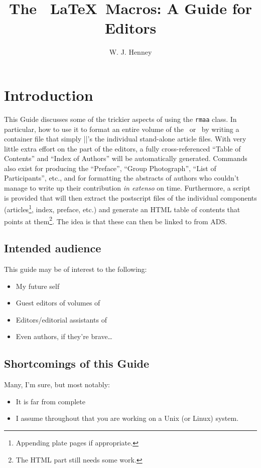 \documentclass[guide]{rmaa}
\title{The \RMAA\ \LaTeX\ Macros: A Guide for Editors\altaffilmark{1}}
\author{W. J. Henney\altaffilmark{2}
  \affil{Instituto de Astronom\'{\i}a, UNAM, Morelia} 
  }
\begin{document}
\maketitle
\tableofcontents 

\section{Introduction}
\label{sec:introduction}

This Guide discusses some of the trickier aspects of using the
\texttt{rmaa} class. In particular, how to use it to format an entire
volume of the \RMAA\ or \RMAASC\ by writing a container file that
simply ||'s the individual stand-alone article files. With very
little extra effort on the part of the editors, a fully
cross-referenced ``Table of Contents'' and ``Index of Authors'' will
be automatically generated. Commands also exist for producing the
``Preface'', ``Group Photograph'', ``List of Participants'', etc., and
for formatting the abstracts of authors who couldn't manage to write
up their contribution \emph{in extenso} on time. Furthermore, a script
is provided that will then extract the postscript files of the
individual components (articles\footnote{Appending plate pages if
  appropriate.}, index, preface, etc.) and generate an HTML table of
contents that points at them\footnote{The HTML part still needs some
  work.}. The idea is that these can then be linked to from ADS.

\subsection{Intended audience}
\label{sec:intended-audience}

This guide may be of interest to the following:
\begin{itemize}
\item My future self
\item Guest editors of volumes of \RMAASC
\item Editors/editorial assistants of \RMAA
\item Even authors, if they're brave\dots
\end{itemize}


\subsection{Shortcomings of this Guide}
\label{sec:shortcomings}
Many, I'm sure, but most notably: 
\begin{itemize}
\item It is far from complete
\item I assume throughout that you are working on a Unix (or Linux)
  system. 
\end{itemize}
\end{document}
